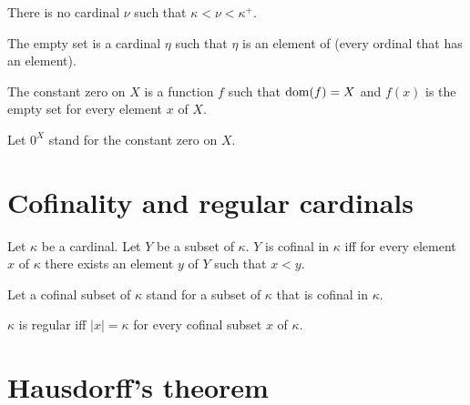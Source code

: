 \documentclass{article}
\newcommand{\Succ}[1]{#1^{+}}
\newcommand{\card}[1]{\left|#1\right|}
\begin{document}
\begin{forthel}
    \begin{axiom}
      There is no cardinal $\nu$ such that $\kappa < \nu < \Succ{\kappa}$.
    \end{axiom}

    \begin{definition}
      The empty set is a cardinal $\eta$ such that $\eta$
      is an element of (every ordinal that has an element).
    \end{definition}

    \begin{definition}
      The constant zero on $X$ is a function $f$ such that $\operatorname{dom}(f) = X$ and $f(x)$ is the empty set for every element $x$ of $X$.
    \end{definition}

    Let $0^X$ stand for the constant zero on $X$.
  \end{forthel}




  \section{Cofinality and regular cardinals}

  \begin{forthel}
    \begin{definition}[Cofinality]
      Let $\kappa$ be a cardinal.
      Let $Y$ be a subset of $\kappa$.
      $Y$ is cofinal in $\kappa$ iff
        for every element $x$ of $\kappa$ there exists an element $y$ of $Y$ such that $x < y$.
    \end{definition}

    Let a cofinal subset of $\kappa$ stand for a subset of $\kappa$ that is cofinal in $\kappa$.


    \begin{definition}
      $\kappa$ is regular iff $\card{x} = \kappa$ for every cofinal subset $x$ of $\kappa$.
    \end{definition}
  \end{forthel}

  \section{Hausdorff's theorem}
\end{document}
